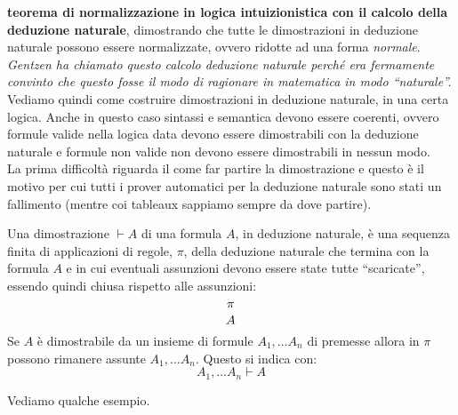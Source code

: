 \documentclass[a4paper,12pt, oneside]{book}
\newcommand*{\bfrac}[2]{\genfrac{}{}{0pt}{}{#1}{#2}}
\begin{document}
\textbf{teorema di normalizzazione in logica intuizionistica con il calcolo
  della deduzione naturale}, dimostrando che tutte le dimostrazioni in deduzione
naturale possono essere normalizzate, ovvero ridotte ad una forma
\textit{normale}. \\
\textit{Gentzen ha chiamato questo calcolo deduzione naturale perché era
  fermamente convinto che questo fosse il modo di ragionare in matematica in
  modo ``naturale''.}\\
Vediamo quindi come costruire dimostrazioni in deduzione naturale, in una certa
logica. Anche in questo caso sintassi e semantica devono essere 
coerenti, ovvero formule valide nella logica data devono essere
dimostrabili con la deduzione naturale e formule non valide non devono essere
dimostrabili in nessun modo.\\
La prima difficoltà riguarda il come far partire la dimostrazione e questo è il
motivo per cui tutti i prover automatici per la deduzione naturale sono stati un
fallimento (mentre coi tableaux sappiamo sempre da dove partire).\\
\begin{definizione}
  Una dimostrazione $\vdash A$ di una formula $A$, in deduzione naturale, è una
  sequenza finita di applicazioni di regole, $\pi$, della deduzione naturale che
  termina con la formula $A$ e in cui eventuali assunzioni devono essere state
  tutte ``scaricate'', essendo quindi chiusa rispetto alle assunzioni:
  \[\bfrac{\pi}{A}\]
  Se $A$ è dimostrabile da un insieme di formule $A_1,\ldots A_n$ di premesse
  allora in $\pi$ possono rimanere assunte $A_1,\ldots A_n$. Questo si indica
  con:
  \[A_1,\ldots A_n\vdash A\]
\end{definizione}
Vediamo qualche esempio.
\end{document}

